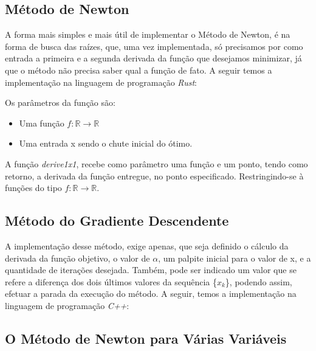 \subsection{Método de Newton}

\hspace{0.8cm}
A forma mais simples e mais útil de implementar o Método de Newton, é na forma
de busca das raízes, que, uma vez implementada, só precisamos por como entrada
a primeira e a segunda derivada da função que desejamos minimizar, já que o
método não precisa saber qual a função de fato. A seguir temos a implementação
na linguagem de programação \textit{Rust}:
\vspace{0.2cm}


Os parâmetros da função são:

    \begin{itemize}
            \item Uma função \(f : \mathbb{R} \rightarrow \mathbb{R}\)
            \item Uma entrada x sendo o chute inicial do ótimo.
    \end{itemize}


A função \textit{derive1x1}, recebe como parâmetro uma função e um ponto,
tendo como retorno, a derivada da função entregue, no ponto especificado.
Restringindo-se à funções do tipo \(f : \mathbb{R} \rightarrow \mathbb{R}\).


\subsection{Método do Gradiente Descendente}

\hspace{0.8cm}
A implementação desse método, exige apenas, que seja definido o cálculo
da derivada da função objetivo, o valor de $\alpha$, um palpite inicial para
o valor de x, e a quantidade de iterações desejada. Também, pode ser
indicado um valor que se refere a diferença dos dois últimos valores
da sequência \{$x_k$\}, podendo assim, efetuar a parada da execução do
método. A seguir, temos a implementação na linguagem de programação
\textit{C++}:

\vspace{0.2cm}





\textcolor[rgb]{1,0,0}{\section{{O Método de Newton para Várias Variáveis}}}
